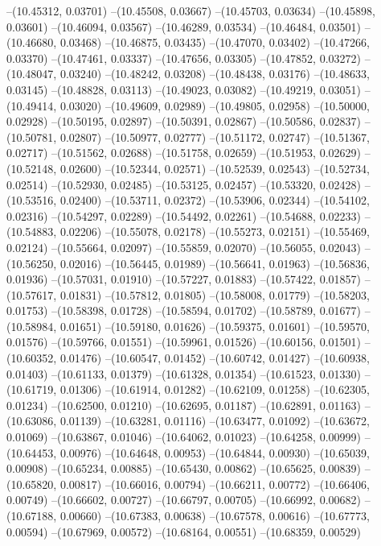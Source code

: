 --(10.45312, 0.03701)
--(10.45508, 0.03667)
--(10.45703, 0.03634)
--(10.45898, 0.03601)
--(10.46094, 0.03567)
--(10.46289, 0.03534)
--(10.46484, 0.03501)
--(10.46680, 0.03468)
--(10.46875, 0.03435)
--(10.47070, 0.03402)
--(10.47266, 0.03370)
--(10.47461, 0.03337)
--(10.47656, 0.03305)
--(10.47852, 0.03272)
--(10.48047, 0.03240)
--(10.48242, 0.03208)
--(10.48438, 0.03176)
--(10.48633, 0.03145)
--(10.48828, 0.03113)
--(10.49023, 0.03082)
--(10.49219, 0.03051)
--(10.49414, 0.03020)
--(10.49609, 0.02989)
--(10.49805, 0.02958)
--(10.50000, 0.02928)
--(10.50195, 0.02897)
--(10.50391, 0.02867)
--(10.50586, 0.02837)
--(10.50781, 0.02807)
--(10.50977, 0.02777)
--(10.51172, 0.02747)
--(10.51367, 0.02717)
--(10.51562, 0.02688)
--(10.51758, 0.02659)
--(10.51953, 0.02629)
--(10.52148, 0.02600)
--(10.52344, 0.02571)
--(10.52539, 0.02543)
--(10.52734, 0.02514)
--(10.52930, 0.02485)
--(10.53125, 0.02457)
--(10.53320, 0.02428)
--(10.53516, 0.02400)
--(10.53711, 0.02372)
--(10.53906, 0.02344)
--(10.54102, 0.02316)
--(10.54297, 0.02289)
--(10.54492, 0.02261)
--(10.54688, 0.02233)
--(10.54883, 0.02206)
--(10.55078, 0.02178)
--(10.55273, 0.02151)
--(10.55469, 0.02124)
--(10.55664, 0.02097)
--(10.55859, 0.02070)
--(10.56055, 0.02043)
--(10.56250, 0.02016)
--(10.56445, 0.01989)
--(10.56641, 0.01963)
--(10.56836, 0.01936)
--(10.57031, 0.01910)
--(10.57227, 0.01883)
--(10.57422, 0.01857)
--(10.57617, 0.01831)
--(10.57812, 0.01805)
--(10.58008, 0.01779)
--(10.58203, 0.01753)
--(10.58398, 0.01728)
--(10.58594, 0.01702)
--(10.58789, 0.01677)
--(10.58984, 0.01651)
--(10.59180, 0.01626)
--(10.59375, 0.01601)
--(10.59570, 0.01576)
--(10.59766, 0.01551)
--(10.59961, 0.01526)
--(10.60156, 0.01501)
--(10.60352, 0.01476)
--(10.60547, 0.01452)
--(10.60742, 0.01427)
--(10.60938, 0.01403)
--(10.61133, 0.01379)
--(10.61328, 0.01354)
--(10.61523, 0.01330)
--(10.61719, 0.01306)
--(10.61914, 0.01282)
--(10.62109, 0.01258)
--(10.62305, 0.01234)
--(10.62500, 0.01210)
--(10.62695, 0.01187)
--(10.62891, 0.01163)
--(10.63086, 0.01139)
--(10.63281, 0.01116)
--(10.63477, 0.01092)
--(10.63672, 0.01069)
--(10.63867, 0.01046)
--(10.64062, 0.01023)
--(10.64258, 0.00999)
--(10.64453, 0.00976)
--(10.64648, 0.00953)
--(10.64844, 0.00930)
--(10.65039, 0.00908)
--(10.65234, 0.00885)
--(10.65430, 0.00862)
--(10.65625, 0.00839)
--(10.65820, 0.00817)
--(10.66016, 0.00794)
--(10.66211, 0.00772)
--(10.66406, 0.00749)
--(10.66602, 0.00727)
--(10.66797, 0.00705)
--(10.66992, 0.00682)
--(10.67188, 0.00660)
--(10.67383, 0.00638)
--(10.67578, 0.00616)
--(10.67773, 0.00594)
--(10.67969, 0.00572)
--(10.68164, 0.00551)
--(10.68359, 0.00529)

